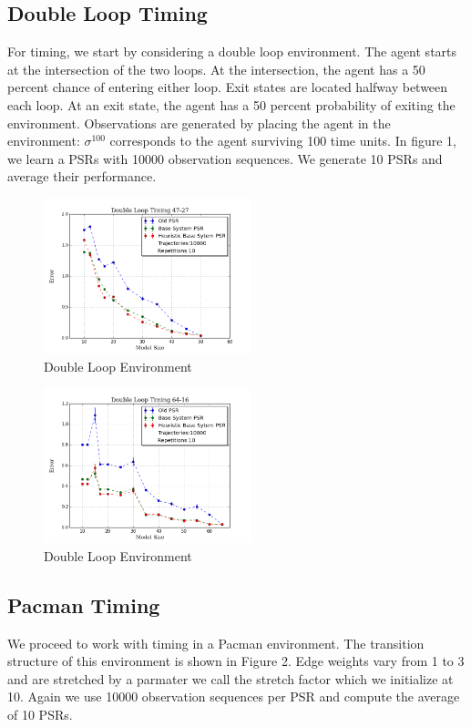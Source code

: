 \documentclass[letterpaper]{article}
\begin{document}
\subsection{Double Loop Timing}

For timing, we start by considering a double loop environment. The agent starts at the intersection of the two loops. At the intersection, the agent has a 50 percent chance of entering either loop. Exit states are located halfway between each loop. At an exit state, the agent has a 50 percent probability of exiting the environment. Observations are generated by placing the agent in the environment: $\sigma^{100}$ corresponds to the agent surviving 100 time units. In figure 1, we learn a PSRs with 10000 observation sequences. We generate 10 PSRs and average their performance. 

\begin{figure}[ht!]
\centering
\includegraphics[width=60mm]{uCOREPICS/DoubleLoopTimingHeuristics47-27.png}
\caption{Double Loop Environment\label{overflow}}
\end{figure}

\begin{figure}[ht!]
\centering
\includegraphics[width=60mm]{uCOREPICS/DoubleLoop64-16Heuristics.png}
\caption{Double Loop Environment\label{overflow}}
\end{figure}

\subsection{Pacman Timing}

We proceed to work with timing in a Pacman environment. The transition structure of this environment is shown in Figure 2. Edge weights vary from 1 to 3 and are stretched by a parmater we call the stretch factor which we initialize at 10. Again we use 10000 observation sequences per PSR and compute the average of 10 PSRs.
\end{document}
